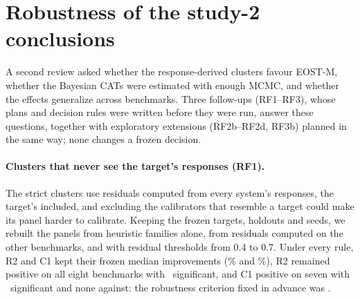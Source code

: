 \section{Robustness of the study-2 conclusions}
\label{sec:robust}

A second review asked whether the response-derived clusters favour EOST-M, whether the
Bayesian CATs were estimated with enough MCMC, and whether the effects generalize across
benchmarks. Three follow-ups (RF1--RF3), whose plans and decision rules were written before
they were run, answer these questions, together with exploratory extensions (RF2b--RF2d,
RF3b) planned in the same way; none changes a frozen decision.

\paragraph{Clusters that never see the target's responses (RF1).} The strict clusters use
residuals computed from every system's responses, the target's included, and excluding the
calibrators that resemble a target could make its panel harder to calibrate. Keeping the
frozen targets, holdouts and seeds, we rebuilt the panels from heuristic families alone,
from residuals computed on the other benchmarks, and with residual thresholds from 0.4 to 0.7.
Under every rule, R2 and C1 kept their frozen median improvements (\RobRTwoMedMin\% and
\RobCOneMedMin\%), R2 remained positive on all eight benchmarks with \RobRTwoFavRange\
significant, and C1 positive on seven with \RobCOneFavRange\ significant and none against:
the robustness criterion fixed in advance was \RobRuleMet.

